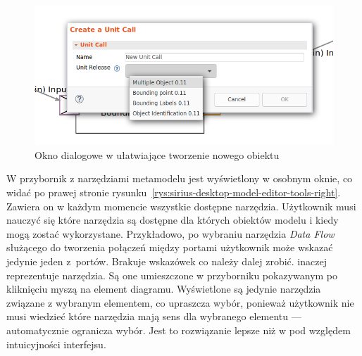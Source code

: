 \begin{figure}[!hb]
  \centering

  \includegraphics[width=0.95\linewidth]{./images/sirius-desktop-create-unit-call-dialog.png}
  \caption{Okno dialogowe w \SiriusDesktop{} ułatwiające tworzenie nowego
    obiektu}\label{rys:sirius-desktop-create-unit-call-dialog}
\end{figure}

W \SiriusDesktop{} przybornik z narzędziami metamodelu jest wyświetlony
w osobnym oknie, co widać po prawej stronie
rysunku~\ref{rys:sirius-desktop-model-editor-tools-right}. Zawiera on w każdym
momencie wszystkie dostępne narzędzia.
Użytkownik musi nauczyć się które narzędzia są dostępne dla których obiektów
modelu i kiedy mogą zostać wykorzystane. Przykładowo, po wybraniu narzędzia
\emph{Data Flow} służącego do tworzenia połączeń między portami użytkownik może
wskazać jedynie jeden z~portów. Brakuje wskazówek co należy dalej zrobić.
\SiriusWeb{} inaczej reprezentuje narzędzia. Są one umieszczone w
przyborniku pokazywanym po kliknięciu myszą na element diagramu. Wyświetlone są
jedynie narzędzia związane z wybranym elementem, co upraszcza wybór, ponieważ
użytkownik nie musi wiedzieć które narzędzia mają sens dla wybranego elementu
--- \SiriusWeb{} automatycznie ogranicza wybór. Jest to rozwiązanie lepsze
niż w \SiriusDesktop{} pod względem intuicyjności interfejsu.

